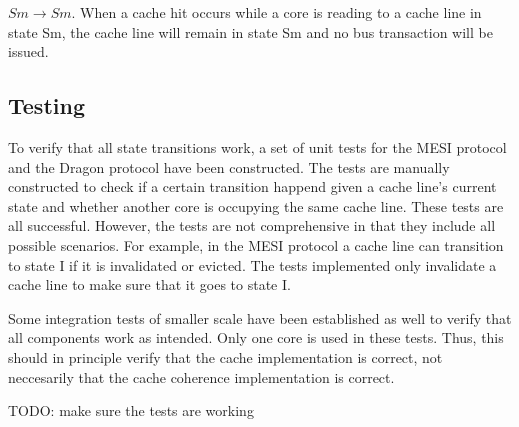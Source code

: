 $Sm \to Sm$.
When a cache hit occurs while a core is reading to a cache line in state Sm, the cache line will remain in state Sm and no bus transaction will be issued.

\subsection{Testing}
To verify that all state transitions work, a set of unit tests for the MESI protocol and the Dragon protocol have been constructed.
The tests are manually constructed to check if a certain transition happend given a cache line's current state and whether another core is occupying the same cache line.
These tests are all successful.
However, the tests are not comprehensive in that they include all possible scenarios.
For example, in the MESI protocol a cache line can transition to state I if it is invalidated or evicted.
The tests implemented only invalidate a cache line to make sure that it goes to state I.

Some integration tests of smaller scale have been established as well to verify that all components work as intended.
Only one core is used in these tests.
Thus, this should in principle verify that the cache implementation is correct, not neccesarily that the cache coherence implementation is correct.

TODO: make sure the tests are working




